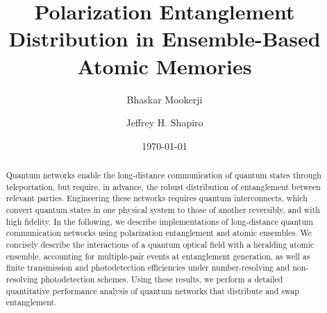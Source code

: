 \documentclass[aps,twocolumn,secnumarabic,amsmath,amssymb,pra,groupedaddress,
showpacs, showkeys]{revtex4-1}
\begin{document}

\title{Polarization Entanglement Distribution in Ensemble-Based Atomic Memories}



\author{Bhaskar Mookerji}
\author{Jeffrey H. Shapiro}


\date{\today}

\begin{abstract}

  Quantum networks enable the long-distance communication of quantum states
  through teleportation, but require, in advance, the robust distribution of
  entanglement between relevant parties. Engineering these networks requires
  quantum interconnects, which convert quantum states in one physical system to
  those of another reversibly, and with high fidelity. In the following, we
  describe implementations of long-distance quantum communication networks
  using polarization entanglement and atomic ensembles. We concisely describe
  the interactions of a quantum optical field with a heralding atomic ensemble,
  accounting for multiple-pair events at entanglement generation, as well as
  finite transmission and photodetection efficiencies under number-resolving
  and non-resolving photodetection schemes. Using these results, we perform a
  detailed quantitative performance analysis of quantum networks that
  distribute and swap entanglement.

\end{abstract}
\end{document}
